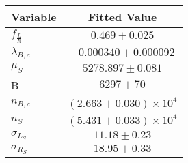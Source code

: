 \begin{tabular}[t]{lc}
\hline
Variable &Fitted Value\\
\hline\hline
$f_{\frac{L}{R}}$&$0.469\pm0.025$\\
\hline
$\lambda_{B,c}$&$-0.000340\pm0.000092$\\
\hline
$\mu_S$&$5278.897\pm0.081$\\
\hline
B&$6297\pm70$\\
\hline
$n_{B,c}$&$(2.663\pm0.030)\times 10^4$\\
\hline
$n_S$&$(5.431\pm0.033)\times 10^4$\\
\hline
$\sigma_{L_S}$&$11.18\pm0.23$\\
\hline
$\sigma_{R_S}$&$18.95\pm0.33$\\
\hline
\end{tabular}